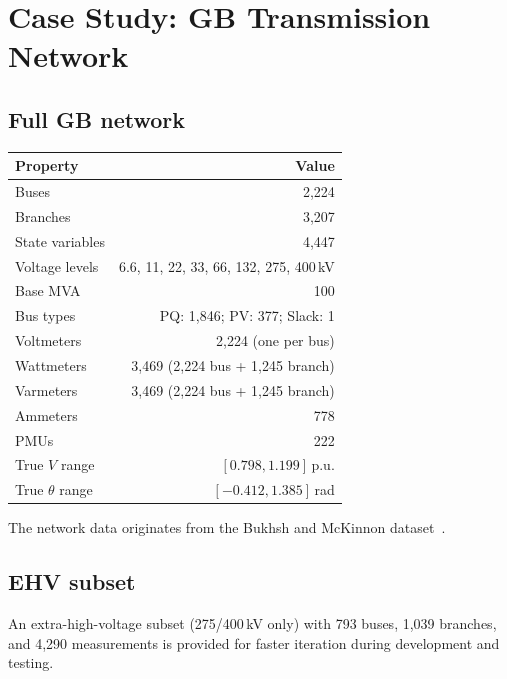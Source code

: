 \documentclass[11pt,a4paper]{article}
\begin{document}

\section{Case Study: GB Transmission Network}\label{sec:case}

\subsection{Full GB network}

\begin{center}
\small
\begin{tabular}{lr}
  \toprule
  \textbf{Property} & \textbf{Value} \\
  \midrule
  Buses              & 2,224 \\
  Branches           & 3,207 \\
  State variables    & 4,447 \\
  Voltage levels     & 6.6, 11, 22, 33, 66, 132, 275, 400\,kV \\
  Base MVA           & 100 \\
  Bus types          & PQ: 1,846; PV: 377; Slack: 1 \\
  Voltmeters         & 2,224 (one per bus) \\
  Wattmeters         & 3,469 (2,224 bus + 1,245 branch) \\
  Varmeters          & 3,469 (2,224 bus + 1,245 branch) \\
  Ammeters           & 778 \\
  PMUs               & 222 \\
  True $V$ range     & $[0.798, 1.199]$\,p.u. \\
  True $\theta$ range & $[-0.412, 1.385]$\,rad \\
  \bottomrule
\end{tabular}
\end{center}

\noindent
The network data originates from the Bukhsh and McKinnon
dataset~\cite{bukhsh2013}.

\subsection{EHV subset}

An extra-high-voltage subset (275/400\,kV only) with 793 buses, 1,039
branches, and 4,290 measurements is provided for faster iteration during
development and testing.
\end{document}

